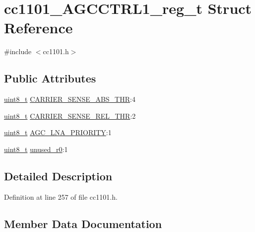 \hypertarget{structcc1101___a_g_c_c_t_r_l1__reg__t}{}\section{cc1101\+\_\+\+A\+G\+C\+C\+T\+R\+L1\+\_\+reg\+\_\+t Struct Reference}
\label{structcc1101___a_g_c_c_t_r_l1__reg__t}


{\ttfamily \#include $<$cc1101.\+h$>$}

\subsection*{Public Attributes}
\begin{DoxyCompactItemize}
\item 
\hyperlink{_p_e___types_8h_aba7bc1797add20fe3efdf37ced1182c5}{uint8\+\_\+t} \hyperlink{structcc1101___a_g_c_c_t_r_l1__reg__t_a2fc3c1204408d25d6ab1b2905697b3ec}{C\+A\+R\+R\+I\+E\+R\+\_\+\+S\+E\+N\+S\+E\+\_\+\+A\+B\+S\+\_\+\+T\+HR}\+:4
\item 
\hyperlink{_p_e___types_8h_aba7bc1797add20fe3efdf37ced1182c5}{uint8\+\_\+t} \hyperlink{structcc1101___a_g_c_c_t_r_l1__reg__t_aa3345c6ea6f1f86ae3a8c877fdf91677}{C\+A\+R\+R\+I\+E\+R\+\_\+\+S\+E\+N\+S\+E\+\_\+\+R\+E\+L\+\_\+\+T\+HR}\+:2
\item 
\hyperlink{_p_e___types_8h_aba7bc1797add20fe3efdf37ced1182c5}{uint8\+\_\+t} \hyperlink{structcc1101___a_g_c_c_t_r_l1__reg__t_aa32bacd6fda1771cf23273e266dce6b1}{A\+G\+C\+\_\+\+L\+N\+A\+\_\+\+P\+R\+I\+O\+R\+I\+TY}\+:1
\item 
\hyperlink{_p_e___types_8h_aba7bc1797add20fe3efdf37ced1182c5}{uint8\+\_\+t} \hyperlink{structcc1101___a_g_c_c_t_r_l1__reg__t_aacb7458343a76fab10a3117d5e6544c6}{unused\+\_\+r0}\+:1
\end{DoxyCompactItemize}


\subsection{Detailed Description}


Definition at line 257 of file cc1101.\+h.



\subsection{Member Data Documentation}
